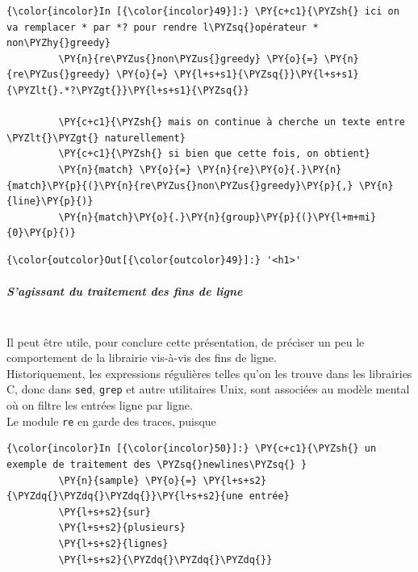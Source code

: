     \begin{Verbatim}[commandchars=\\\{\}]
{\color{incolor}In [{\color{incolor}49}]:} \PY{c+c1}{\PYZsh{} ici on va remplacer * par *? pour rendre l\PYZsq{}opérateur * non\PYZhy{}greedy}
         \PY{n}{re\PYZus{}non\PYZus{}greedy} \PY{o}{=} \PY{n}{re\PYZus{}greedy} \PY{o}{=} \PY{l+s+s1}{\PYZsq{}}\PY{l+s+s1}{\PYZlt{}.*?\PYZgt{}}\PY{l+s+s1}{\PYZsq{}}
         
         \PY{c+c1}{\PYZsh{} mais on continue à cherche un texte entre \PYZlt{}\PYZgt{} naturellement}
         \PY{c+c1}{\PYZsh{} si bien que cette fois, on obtient}
         \PY{n}{match} \PY{o}{=} \PY{n}{re}\PY{o}{.}\PY{n}{match}\PY{p}{(}\PY{n}{re\PYZus{}non\PYZus{}greedy}\PY{p}{,} \PY{n}{line}\PY{p}{)}
         \PY{n}{match}\PY{o}{.}\PY{n}{group}\PY{p}{(}\PY{l+m+mi}{0}\PY{p}{)}
\end{Verbatim}


\begin{Verbatim}[commandchars=\\\{\}]
{\color{outcolor}Out[{\color{outcolor}49}]:} '<h1>'
\end{Verbatim}
            
    \hypertarget{sagissant-du-traitement-des-fins-de-ligne}{%
\subparagraph{S'agissant du traitement des fins de
ligne\\\\}\label{sagissant-du-traitement-des-fins-de-ligne}}

    Il peut être utile, pour conclure cette présentation, de préciser un peu
le comportement de la librairie vis-à-vis des fins de ligne.\\

Historiquement, les expressions régulières telles qu'on les trouve dans
les librairies C, donc dans \texttt{sed}, \texttt{grep} et autre
utilitaires Unix, sont associées au modèle mental où on filtre les
entrées ligne par ligne.\\

Le module \texttt{re} en garde des traces, puisque

    \begin{Verbatim}[commandchars=\\\{\}]
{\color{incolor}In [{\color{incolor}50}]:} \PY{c+c1}{\PYZsh{} un exemple de traitement des \PYZsq{}newlines\PYZsq{} }
         \PY{n}{sample} \PY{o}{=} \PY{l+s+s2}{\PYZdq{}\PYZdq{}\PYZdq{}}\PY{l+s+s2}{une entrée}
         \PY{l+s+s2}{sur}
         \PY{l+s+s2}{plusieurs}
         \PY{l+s+s2}{lignes}
         \PY{l+s+s2}{\PYZdq{}\PYZdq{}\PYZdq{}}
\end{Verbatim}


